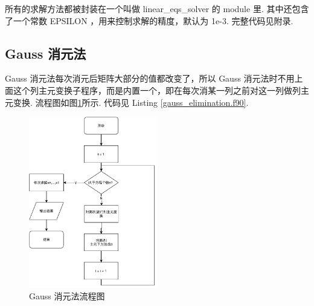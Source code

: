 \documentclass{article}
\begin{document}
	所有的求解方法都被封装在一个叫做 linear\_eqs\_solver 的 module 里. 其中还包含了一个常数 EPSILON ，用来控制求解的精度，默认为 1e-3. 完整代码见附录.
	\subsection{Gauss 消元法}
	Gauss 消元法每次消元后矩阵大部分的值都改变了，所以 Gauss 消元法时不用上面这个列主元变换子程序，而是内置一个，即在每次消某一列之前对这一列做列主元变换. 流程图如图\ref{fig:gauss_elimination}所示. 代码见 Listing \ref{gauss_elimination.f90}.
	\begin{figure}[h!tb]
		\centering
		\includegraphics[width=0.5\textwidth]{./utils/gauss_elimination.pdf}
		\caption{ Gauss 消元法流程图\label{fig:gauss_elimination}}
	\end{figure}
	
\end{document}
